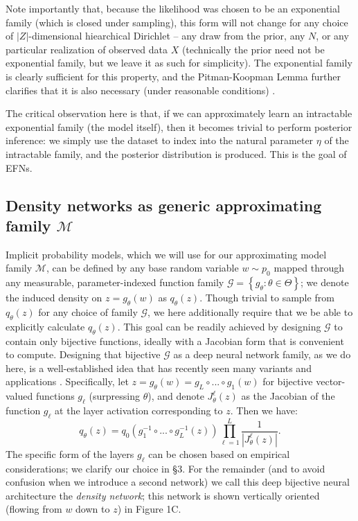 \documentclass[twoside]{article}
\begin{document}
Note importantly that, because the likelihood was chosen to be an exponential family (which is closed under sampling), this form will not change for any choice of $|Z|$-dimensional hiearchical Dirichlet -- any draw from the prior, any $N$, or any particular realization of observed data $X$ (technically the prior need not be exponential family, but we leave it as such for simplicity).  
The exponential family is clearly sufficient for this property, and the Pitman-Koopman Lemma further clarifies that it is also necessary (under reasonable conditions) \cite[\S3.3.3]{robert2007bayesian}.

The critical observation here is that, if we can approximately learn an intractable exponential family (the model itself), then it becomes trivial to perform posterior inference: we simply use the dataset to index into the natural parameter $\eta$ of the intractable family, and the posterior distribution is produced.  This is the goal of EFNs.

\subsection{Density networks as generic approximating family $\mathcal{M}$}

Implicit probability models, which we will use for our approximating model family $\mathcal{M}$, can be defined by any base random variable $w\sim p_0$ mapped through any measurable, parameter-indexed function family  $\mathcal{G} = \left\{g_\theta: \theta \in \Theta\right\}$; we denote the induced density on $z=g_\theta(w)$ as $q_\theta(z)$.   
Though trivial to sample from $q_\theta(z)$ for any choice of family $\mathcal{G}$, we here additionally require that we be able to explicitly calculate $q_\theta(z)$.  
This goal can be readily achieved by designing $\mathcal{G}$ to contain only bijective functions, ideally with a Jacobian form that is convenient to compute. %
Designing that bijective $\mathcal{G}$ as a deep neural network family, as we do here, is a well-established idea that has recently seen many variants and applications \cite{mackay1997density, baird2005one, tabak2010density, rippel2013high, uria2013rnade, rezende2015variational, dinh2016density, papamakarios2017masked, jacobsen2018revnet}.  Specifically, let $z = g_\theta(w) = g_L \circ ... \circ g_1(w)$ for bijective vector-valued functions $g_\ell$ (surpressing $\theta$), and denote $J^\ell_\theta(z)$ as the Jacobian of the function $g_\ell$ at the layer activation corresponding to $z$.  Then we have:
%
{\small $$q_\theta(z) = q_0\left( g_1^{-1} \circ ... \circ g_L^{-1}(z) \right) \prod_{\ell=1}^L \frac{1}{| J^\ell_\theta(z) |}.$$}
%
The specific form of the layers $g_\ell$ can be chosen based on empirical considerations; we clarify our choice in \S3.  For the remainder (and to avoid confusion when we introduce a second network) we call this deep bijective neural architecture the \emph{density network}; this network is shown vertically oriented (flowing from $w$ down to $z$) in Figure 1C.
\end{document}
